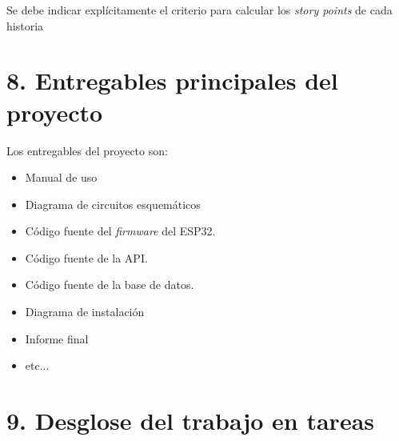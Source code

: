 \documentclass[
11pt, %
codirector, %
]{charter}
\begin{document}
Se debe indicar explícitamente el criterio para calcular los \textit{story points} de cada historia


\section{8. Entregables principales del proyecto}
\label{sec:entregables}


Los entregables del proyecto son:

\begin{itemize}
	\item Manual de uso
	\item Diagrama de circuitos esquemáticos
	\item Código fuente del \textit{firmware} del ESP32.
	\item Código fuente de la API.
	\item Código fuente de la base de datos.
	\item Diagrama de instalación
	\item Informe final
	\item etc...
\end{itemize}



\section{9. Desglose del trabajo en tareas}
\label{sec:wbs}
\end{document}
